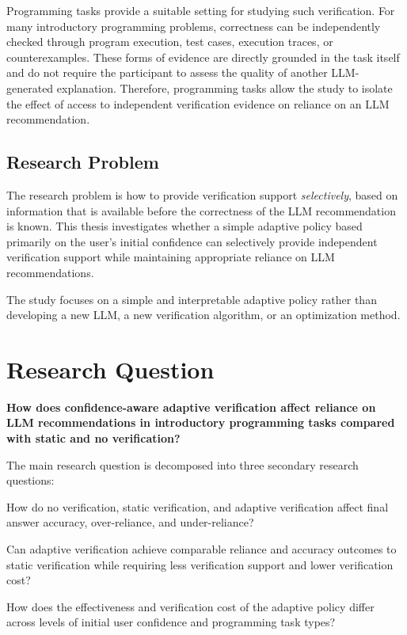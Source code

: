 \documentclass[oneside,final,14pt,a4paper]{extreport}
\theoremstyle{definition}
\theoremstyle{remark}
\begin{document}
Programming tasks provide a suitable setting for studying such verification.
For many introductory programming problems, correctness can be independently
checked through program execution, test cases, execution traces, or
counterexamples. These forms of evidence are directly grounded in the task
itself and do not require the participant to assess the quality of another
LLM-generated explanation. Therefore, programming tasks allow the study to
isolate the effect of access to independent verification evidence on reliance
on an LLM recommendation.

\subsection{Research Problem}
The research problem is how to provide verification support \emph{selectively},
based on information that is available before the correctness of the LLM
recommendation is known. This thesis investigates whether a simple adaptive
policy based primarily on the user's initial confidence can selectively provide
independent verification support while maintaining appropriate reliance on LLM
recommendations.

The study focuses on a simple and interpretable adaptive policy rather than
developing a new LLM, a new verification algorithm, or an optimization method.

\section{Research Question}

\textbf{How does confidence-aware adaptive verification affect reliance on LLM
recommendations in introductory programming tasks compared with static and no
verification?}

The main research question is decomposed into three secondary research
questions:

\begin{description}[leftmargin=2.5cm,style=nextline]
    \item[RQ1.] How do no verification, static verification, and adaptive
    verification affect final answer accuracy, over-reliance, and
    under-reliance?

    \item[RQ2.] Can adaptive verification achieve comparable reliance and accuracy
outcomes to static verification while requiring less verification support and
lower verification cost?

    \item[RQ3.] How does the effectiveness and verification cost of the adaptive
policy differ across levels of initial user confidence and programming task
types?
\end{description}
\end{document}
